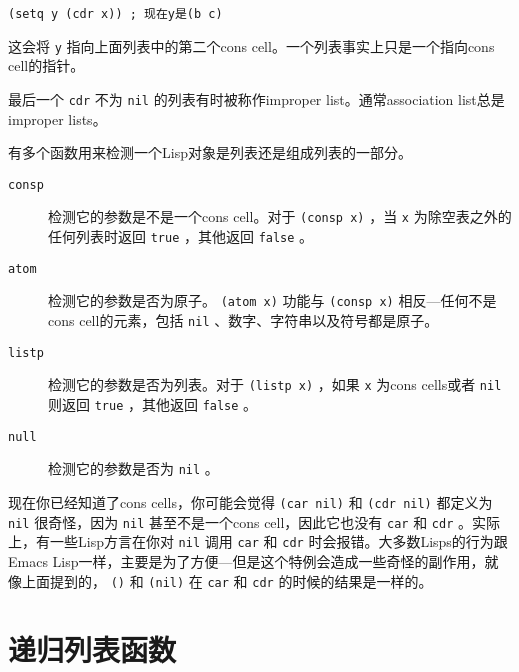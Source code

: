 \begin{verbatim}
(setq y (cdr x)) ; 现在y是(b c)
\end{verbatim}

这会将 \texttt{y} 指向上面列表中的第二个cons cell。一个列表事实上只是一个指向cons cell的指针。

最后一个 \texttt{cdr} 不为 \texttt{nil} 的列表有时被称作improper list。通常association list总是improper lists。

有多个函数用来检测一个Lisp对象是列表还是组成列表的一部分。

\begin{description}
  \item[ \texttt{consp} ] 检测它的参数是不是一个cons cell。对于 \texttt{(consp x)} ，当 \texttt{x} 为除空表之外的任何列表时返回 \texttt{true} ，其他返回 \texttt{false} 。
  \item[ \texttt{atom} ] 检测它的参数是否为原子。 \texttt{(atom x)} 功能与 \texttt{(consp x)} 相反---任何不是cons cell的元素，包括 \texttt{nil} 、数字、字符串以及符号都是原子。
  \item[ \texttt{listp} ] 检测它的参数是否为列表。对于 \texttt{(listp x)} ，如果 \texttt{x} 为cons cells或者 \texttt{nil} 则返回 \texttt{true} ，其他返回 \texttt{false} 。
  \item[ \texttt{null} ] 检测它的参数是否为 \texttt{nil} 。
\end{description}

现在你已经知道了cons cells，你可能会觉得 \texttt{(car nil)} 和 \texttt{(cdr nil)} 都定义为 \texttt{nil} 很奇怪，因为 \texttt{nil} 甚至不是一个cons cell，因此它也没有 \texttt{car} 和 \texttt{cdr} 。实际上，有一些Lisp方言在你对 \texttt{nil} 调用 \texttt{car} 和 \texttt{cdr} 时会报错。大多数Lisps的行为跟Emacs Lisp一样，主要是为了方便---但是这个特例会造成一些奇怪的副作用，就像上面提到的， \texttt{()} 和 \texttt{(nil)} 在 \texttt{car} 和 \texttt{cdr} 的时候的结果是一样的。

\section{递归列表函数}
\label{section:06-Recursive-List-Functions}

